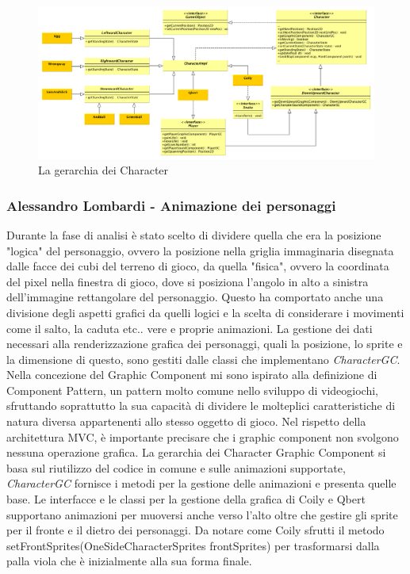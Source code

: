 \documentclass[a4paper,12pt, hidelinks]{report}
\begin{document}
\begin{figure}[H]
\centering{}
\includegraphics[width=\linewidth]{img/GerarchiaCharacters}
\caption{La gerarchia dei Character}
\label{img:GerarchiaCharacters}
\end{figure}

\begin{flushright}
\item\subsubsection{Alessandro Lombardi - Animazione dei personaggi}
\end{flushright}

Durante la fase di analisi è stato scelto di dividere quella che era la posizione "logica" del personaggio, ovvero la posizione nella griglia immaginaria disegnata dalle facce dei cubi del terreno di gioco, da quella "fisica", ovvero la coordinata del pixel nella finestra di gioco, dove si posiziona l'angolo in alto a sinistra dell'immagine rettangolare del personaggio. Questo ha comportato anche una divisione degli aspetti grafici da quelli logici e la scelta di considerare i movimenti come il salto, la caduta etc.. vere e proprie animazioni. La gestione dei dati necessari alla renderizzazione grafica dei personaggi, quali la posizione, lo sprite e la dimensione di questo, sono gestiti dalle classi che implementano \emph{CharacterGC}. Nella concezione del Graphic Component mi sono ispirato alla definizione di Component Pattern, un pattern molto comune nello sviluppo di videogiochi, sfruttando soprattutto la sua capacità di dividere le molteplici caratteristiche di natura diversa appartenenti allo stesso oggetto di gioco. Nel rispetto della architettura MVC, è importante precisare che i graphic component non svolgono nessuna operazione grafica. La gerarchia dei Character Graphic Component si basa sul riutilizzo del codice in comune e sulle animazioni supportate, \emph{CharacterGC} fornisce i metodi per la gestione delle animazioni e presenta quelle base. Le interfacce e le classi per la gestione della grafica di Coily e Qbert supportano animazioni per muoversi anche verso l'alto oltre che gestire gli sprite per il fronte e il dietro dei personaggi. Da notare come Coily sfrutti il metodo setFrontSprites(OneSideCharacterSprites frontSprites) per trasformarsi dalla palla viola che è inizialmente alla sua forma finale.
\end{document}
